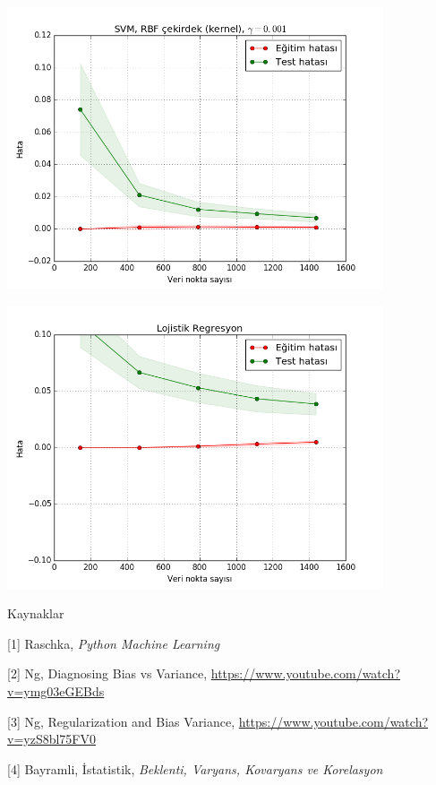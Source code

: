\documentclass[12pt,fleqn]{article}\usepackage{../../common}
\begin{document}
\includegraphics[width=30em]{modeval_03.png}

\includegraphics[width=30em]{modeval_04.png}


Kaynaklar

[1] Raschka, {\em Python Machine Learning}

[2] Ng, Diagnosing Bias vs Variance, \url{https://www.youtube.com/watch?v=ymg03eGEBds}

[3] Ng, Regularization and Bias Variance, \url{https://www.youtube.com/watch?v=yzS8bl75FV0}

[4] Bayramli, İstatistik, {\em Beklenti, Varyans, Kovaryans ve Korelasyon}
\end{document}
